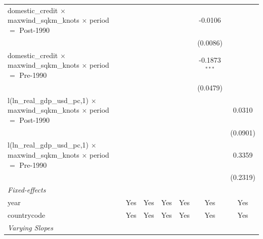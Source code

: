 \begin{tabular}{lcccccc}
   domestic\_credit $\times$ maxwind\_sqkm\_knots $\times$ period $=$ Post-1990                    &             &                         &                 &          & -0.0106                 &   \\   
                                                                                                   &             &                         &                 &          & (0.0086)                &   \\   
   domestic\_credit $\times$ maxwind\_sqkm\_knots $\times$ period $=$ Pre-1990                     &             &                         &                 &          & -0.1873$^{***}$         &   \\   
                                                                                                   &             &                         &                 &          & (0.0479)                &   \\   
   l(ln\_real\_gdp\_usd\_pc,1) $\times$ maxwind\_sqkm\_knots $\times$ period $=$ Post-1990         &             &                         &                 &          &                         & 0.0310\\   
                                                                                                   &             &                         &                 &          &                         & (0.0901)\\   
   l(ln\_real\_gdp\_usd\_pc,1) $\times$ maxwind\_sqkm\_knots $\times$ period $=$ Pre-1990          &             &                         &                 &          &                         & 0.3359\\   
                                                                                                   &             &                         &                 &          &                         & (0.2319)\\   
   \midrule
   \emph{Fixed-effects}\\
   year                                                                                            & Yes         & Yes                     & Yes             & Yes      & Yes                     & Yes\\  
   countrycode                                                                                     & Yes         & Yes                     & Yes             & Yes      & Yes                     & Yes\\  
   \midrule
   \emph{Varying Slopes}\\

\end{tabular}
